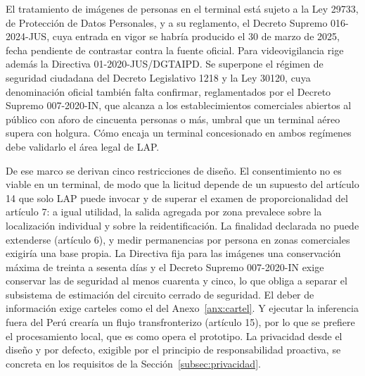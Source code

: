 El tratamiento de imágenes de personas en el terminal está sujeto a la Ley 29733, de
Protección de Datos Personales, y a su reglamento, el Decreto Supremo 016-2024-JUS, cuya
entrada en vigor se habría producido el 30 de marzo de 2025, fecha pendiente de contrastar
contra la fuente oficial. Para videovigilancia rige además la Directiva 01-2020-JUS/DGTAIPD. Se superpone
el régimen de seguridad ciudadana del Decreto Legislativo 1218 y la Ley 30120, cuya
denominación oficial también falta confirmar, reglamentados por el Decreto Supremo
007-2020-IN, que alcanza a los establecimientos comerciales abiertos al público con aforo de
cincuenta personas o más, umbral que un terminal aéreo supera con
holgura. Cómo
encaja un terminal concesionado en ambos regímenes debe validarlo el área legal de LAP.

De ese marco se derivan cinco restricciones de diseño. El consentimiento no es viable en un
terminal, de modo que la licitud depende de un supuesto del artículo 14 que solo LAP puede
invocar y de superar el examen de proporcionalidad del artículo 7: a igual utilidad, la salida
agregada por zona prevalece sobre la localización individual y sobre la reidentificación. La
finalidad declarada no puede extenderse (artículo 6), y medir permanencias por persona en
zonas comerciales exigiría una base propia. La Directiva fija para las imágenes una
conservación máxima de treinta a sesenta días y el Decreto Supremo 007-2020-IN exige
conservar las de seguridad al menos cuarenta y cinco, lo que obliga a separar el subsistema de
estimación del circuito cerrado de seguridad. El deber de información exige carteles como el
del Anexo~\ref{anx:cartel}. Y ejecutar la inferencia fuera del Perú crearía un flujo
transfronterizo (artículo 15), por lo que se prefiere el procesamiento local, que es como opera
el prototipo. La privacidad desde el diseño y por defecto, exigible por el principio de
responsabilidad proactiva, se concreta en los requisitos de la Sección~\ref{subsec:privacidad}.

